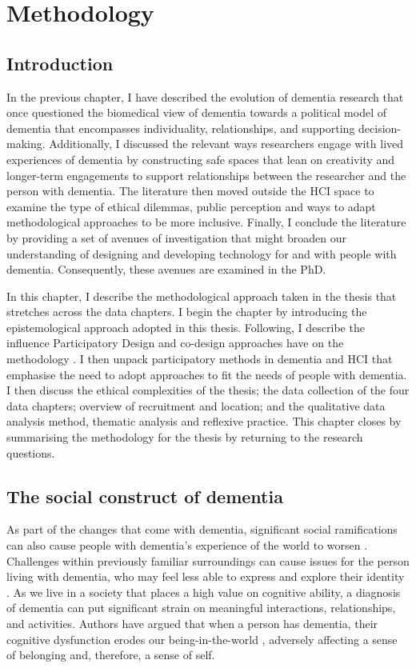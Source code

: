 \chapter{Methodology}
\label{Methodology}

\section{Introduction}
\label{Method:Intro}

In the previous chapter, I have described the evolution of dementia research that once questioned the biomedical view of dementia towards a political model of dementia that encompasses individuality, relationships, and supporting decision-making. Additionally, I discussed the relevant ways researchers engage with lived experiences of dementia by constructing safe spaces that lean on creativity and longer-term engagements to support relationships between the researcher and the person with dementia. The literature then moved outside the HCI space to examine the type of ethical dilemmas, public perception and ways to adapt methodological approaches to be more inclusive. Finally, I conclude the literature by providing a set of avenues of investigation that might broaden our understanding of designing and developing technology for and with people with dementia. Consequently, these avenues are examined in the PhD.

In this chapter, I describe the methodological approach taken in the thesis that stretches across the data chapters. I begin the chapter by introducing the epistemological approach adopted in this thesis. Following, I describe the influence Participatory Design and co-design approaches have on the methodology \citep{duarte2018participatory}. I then unpack participatory methods in dementia and HCI that emphasise the need to adopt approaches to fit the needs of people with dementia. I then discuss the ethical complexities of the thesis; the data collection of the four data chapters; overview of recruitment and location; and the qualitative data analysis method, thematic analysis and reflexive practice. This chapter closes by summarising the methodology for the thesis by returning to the research questions.  

\section{The social construct of dementia}
\label{social construct}
As part of the changes that come with dementia, significant social ramifications can also cause people with dementia's experience of the world to worsen \citep{hampson_dementia:_2016}. Challenges within previously familiar surroundings can cause issues for the person living with dementia, who may feel less able to express and explore their identity \citep{john_killick_claire_craig_creativity_2012}. As we live in a society that places a high value on cognitive ability, a diagnosis of dementia can put significant strain on meaningful interactions, relationships, and activities. Authors have argued that when a person has dementia, their cognitive dysfunction erodes our being-in-the-world \citep{hampson_dementia:_2016}, adversely affecting a sense of belonging and, therefore, a sense of self.

